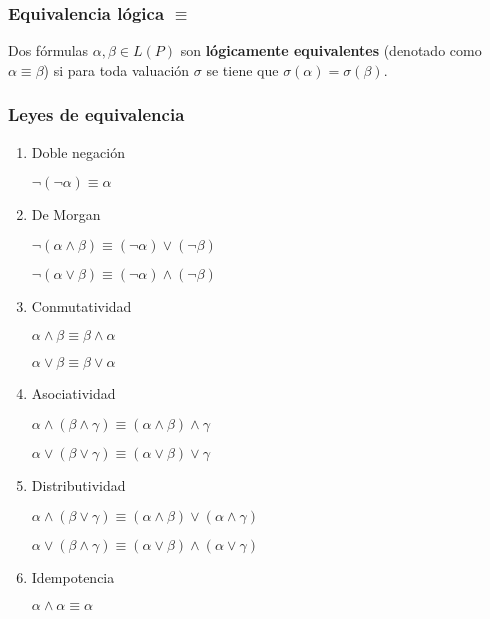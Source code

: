 \begin{multicols}{2}
    \subsubsection*{Equivalencia lógica $\equiv$}
    Dos fórmulas $\alpha, \beta \in L(P)$ son \textbf{lógicamente equivalentes} (denotado como $\alpha \equiv \beta$) si para toda valuación $\sigma$ se tiene que $\sigma(\alpha) = \sigma(\beta)$.
    
    \subsubsection*{Leyes de equivalencia}
        \begin{enumerate}
            \item Doble negación
    
                  $\neg(\neg \alpha) \equiv \alpha$
    
            \item De Morgan
    
                  $\neg(\alpha \wedge \beta) \equiv (\neg \alpha) \vee (\neg \beta)$
    
                  $\neg(\alpha \vee \beta) \equiv (\neg \alpha) \wedge (\neg \beta)$
    
            \item Conmutatividad
    
                  $\alpha \wedge \beta \equiv \beta \wedge \alpha$
    
                  $\alpha \vee \beta \equiv \beta \vee \alpha$
    
            \item Asociatividad
    
                  $\alpha \wedge (\beta \wedge \gamma) \equiv (\alpha \wedge \beta) \wedge \gamma$
    
                  $\alpha \vee (\beta \vee \gamma) \equiv (\alpha \vee \beta) \vee \gamma$
    
            \item Distributividad
    
                  $\alpha \wedge (\beta \vee \gamma) \equiv (\alpha \wedge \beta) \vee (\alpha \wedge \gamma)$
    
                  $\alpha \vee (\beta \wedge \gamma) \equiv (\alpha \vee \beta) \wedge (\alpha \vee \gamma)$
    
            \item Idempotencia
    
                  $\alpha \wedge \alpha \equiv \alpha$
                  \vspace{-4px}
    

\end{enumerate}
\end{multicols}
